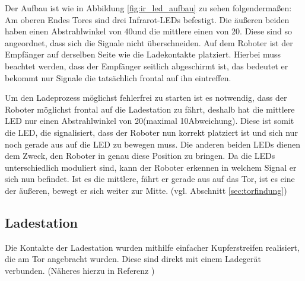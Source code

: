 Der Aufbau ist wie in Abbildung \ref{fig:ir_led_aufbau} zu sehen folgendermaßen:
Am oberen Endes Tores sind drei Infrarot-LEDs befestigt. Die äußeren beiden haben einen Abstrahlwinkel von 40\degree  und die mittlere einen von 20\degree. Diese sind so angeordnet, dass sich die Signale nicht überschneiden. Auf dem Roboter ist der Empfänger auf derselben Seite wie die Ladekontakte platziert. Hierbei muss beachtet werden, dass der Empfänger seitlich abgeschirmt ist, das bedeutet er bekommt nur Signale die tatsächlich frontal auf ihn eintreffen.

Um den Ladeprozess möglichst fehlerfrei zu starten ist es notwendig, dass der Roboter möglichst frontal auf die Ladestation zu fährt, deshalb hat die mittlere LED nur einen Abstrahlwinkel von 20\degree  (maximal 10\degree  Abweichung). Diese ist somit die LED, die signalisiert, dass der Roboter nun korrekt platziert ist und sich nur noch gerade aus auf die LED zu bewegen muss. Die anderen beiden LEDs dienen dem Zweck, den Roboter in genau diese Position zu bringen. Da die LEDs unterschiedlich moduliert sind, kann der Roboter erkennen in welchem Signal er sich nun befindet. Ist es die mittlere, fährt er gerade aus auf das Tor, ist es eine der äußeren, bewegt er sich weiter zur Mitte. (vgl. Abschnitt \ref{sec:torfindung})


\subsection{Ladestation}
Die Kontakte der Ladestation wurden mithilfe einfacher Kupferstreifen realisiert, die am Tor angebracht wurden. Diese sind direkt mit einem Ladegerät verbunden. (Näheres hierzu in Referenz \cite{ALEX})

